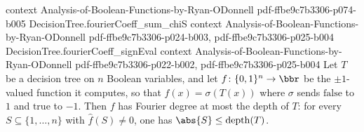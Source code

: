 \begin{theorem}
  {context}
  {Analysis-of-Boolean-Functions-by-Ryan-ODonnell}
  {pdf-ffbe9c7b3306-p074-b005}
\proofstep
  {DecisionTree.fourierCoeff_sum_chiS}
  {context}
  {Analysis-of-Boolean-Functions-by-Ryan-ODonnell}
  {pdf-ffbe9c7b3306-p024-b003,
    pdf-ffbe9c7b3306-p025-b004}
\proofstep
  {DecisionTree.fourierCoeff_signEval}
  {context}
  {Analysis-of-Boolean-Functions-by-Ryan-ODonnell}
  {pdf-ffbe9c7b3306-p022-b002,
    pdf-ffbe9c7b3306-p025-b004}
Let $T$ be a decision tree on $n$ Boolean variables, and let $f\colon\{0,1\}^n\to\bbr$
be the $\pm 1$-valued function it computes, so that $f(x)=\sigma(T(x))$ where $\sigma$
sends $\mathrm{false}$ to $1$ and $\mathrm{true}$ to $-1$. Then $f$ has Fourier degree
at most the depth of $T$: for every $S\subseteq\{1,\dots,n\}$ with $\hat f(S)\ne 0$, one
has $\abs{S}\le\operatorname{depth}(T)$.
\end{theorem}

